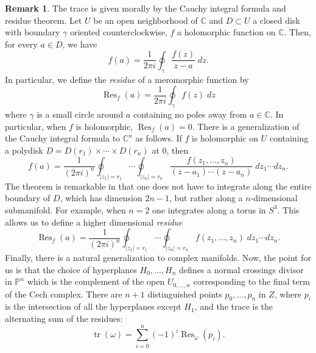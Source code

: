 \documentclass[10pt]{article}
\theoremstyle{definition}
\newtheorem{rmk}[thm]{Remark}
\DeclareMathOperator{\Res}{Res}
\DeclareMathOperator{\tr}{tr}
\newcommand{\PP}{\mathbb{P}}
\newcommand{\C}{\mathbb{C}}
\newcommand{\todo}[1]{\textbf{\textcolor{red}{TODO #1}}}
\begin{document}
\begin{rmk}
The trace is given morally by the Cauchy integral formula and residue theorem.  Let $U$ be an open neighborhood of $\C$ and $D \subset U$ a closed disk with boundary $\gamma$ oriented counterclockwise, $f$ a holomorphic function on $\C$.  Then, for every $a \in D$, we have
$$f(a) = \frac{1}{2 \pi i} \oint_\gamma \frac{f(z)}{z-a} \; dz.$$
In particular, we define the \emph{residue} of a meromorphic function by
$$\Res_f(a) = \frac{1}{2 \pi i} \oint_\gamma f(z) \; dz$$
where $\gamma$ is a small circle around $a$ containing no poles away from $a \in \C$.  In particular, when $f$ is holomorphic, $\Res_f(a) = 0$.  %
There is a generalization of the Cauchy integral formula to $\C^n$ as follows.  If $f$ is holomorphic on $U$ containing a polydisk $D = D(r_1) \times \cdots \times D(r_n)$ at 0, then
$$f(a) = \frac{1}{(2\pi i)^n} \oint_{|z_1| = r_1} \cdots \oint_{|z_n| = r_n} \frac{f(z_1, \ldots, z_n)}{(z-a_1) \cdots (z - a_n)} \; dz_1 \cdots dz_n.$$
The theorem is remarkable in that one does not have to integrate along the entire boundary of $D$, which has dimension $2n - 1$, but rather along a $n$-dimensional submanifold.  For example, when $n = 2$ one integrates along a torus in $S^3$.  This allows us to define a higher dimensional \emph{residue} %
$$\Res_f(a) = \frac{1}{(2\pi i)^n} \oint_{|z_1| = r_1} \cdots \oint_{|z_n| = r_n} f(z_1, \ldots, z_n) \; dz_1 \cdots dz_n.$$
Finally, there is a natural generalization to complex manifolds.  Now, the point for us is that the choice of hyperplanes $H_0, \ldots, H_n$ defines a normal crossings divisor in $\PP^n$ which is the complement of the open $U_{0,\ldots, n}$ corresponding to the final term of the Cech complex.  There are $n+1$ distinguished points $p_0, \ldots, p_n$ in $Z$, where $p_i$ is the intersection of all the hyperplanes except $H_1$, and the trace is the alternating sum of the residues:
$$\tr(\omega) = \sum_{i=0}^n (-1)^i \Res_\omega(p_i).$$
\end{rmk}
\end{document}

